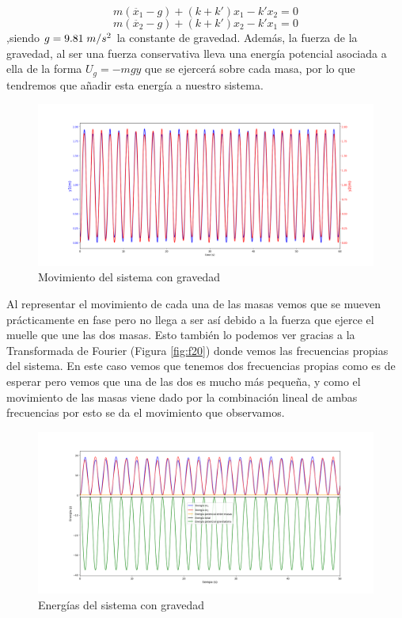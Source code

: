 \documentclass{article}
\begin{document}
\begin{equation}
m(\ddot{x_1}-g)+(k+k')x_1 -k'x_2 = 0\label{ec.:1}
\end{equation}
\begin{equation}
m(\ddot{x_2}-g)+(k+k')x_2 -k'x_1  = 0\label{ec.:2}
\end{equation}
,siendo $g = 9.81\hspace{0.1cm}m/s^2$ la constante de gravedad.\newline\linebreak
Además, la fuerza de la gravedad, al ser una fuerza conservativa lleva una energía potencial asociada a ella de la forma $U_g =-mgy$ que se ejercerá sobre cada masa, por lo que tendremos que añadir esta energía a nuestro sistema.
\begin{figure}[H]
    \centering
    \includegraphics[width=1.0\textwidth]{gravedad}
\caption{Movimiento del sistema con gravedad}
\label{fig:10}
\end{figure}
Al representar el movimiento de cada una de las masas vemos que se mueven prácticamente en fase pero no llega a ser así debido a la fuerza que ejerce el muelle que une las dos masas.
Esto también lo podemos ver gracias a la Transformada de Fourier (Figura \ref{fig:f20}) donde vemos las frecuencias propias del sistema. En este caso vemos que tenemos dos frecuencias propias como es de esperar pero vemos que una de las dos es mucho más pequeña, y como el movimiento de las masas viene dado por la combinación lineal de ambas frecuencias por esto se da el movimiento que observamos.
\begin{figure}[H]
    \centering
    \includegraphics[width=1.0\textwidth]{gravedad_energias}
\caption{Energías del sistema con gravedad}
\label{fig:f}
\end{figure}
\end{document}
